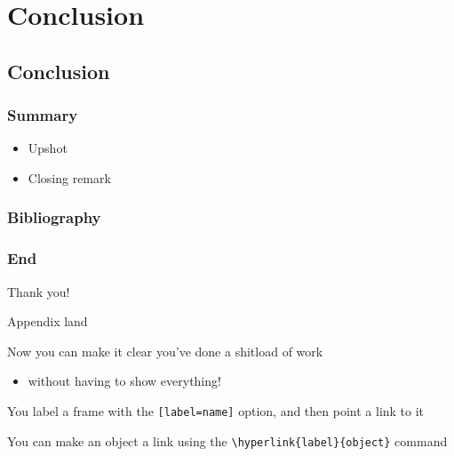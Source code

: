 \documentclass[11pt, aspectratio=169]{beamer}
\newenvironment{wideitemize}{\itemize\addtolength{\itemsep}{10pt}}{\enditemize}
\begin{document}
\section{Conclusion}
\subsection{Conclusion}

\begin{frame}[t]\frametitle{Summary}
%
\begin{itemize}
\item Upshot
\item Closing remark
\end{itemize}

\end{frame}

\begin{frame}[t]\frametitle{Bibliography}
\printbibliography
\end{frame}
\begin{frame}[t]\frametitle{End}
\begin{center}
\Huge
Thank you!
\end{center}
\end{frame}
\appendix
\begin{frame}[label=appendix_end]{Appendix land}
  \begin{wideitemize}
    \item[] Now you can make it clear you've done a shitload of work
      \begin{itemize}
      \item[]  without having to show everything! \hyperlink{data_slide}{}
      \end{itemize}
    \item[] You label a frame with the \texttt{[label=name]} option, and then point a link to it
    \item[] You can make an object a link using the \texttt{\textbackslash hyperlink\{label\}\{object\}} command
  \end{wideitemize}
\end{frame}
\end{document}
